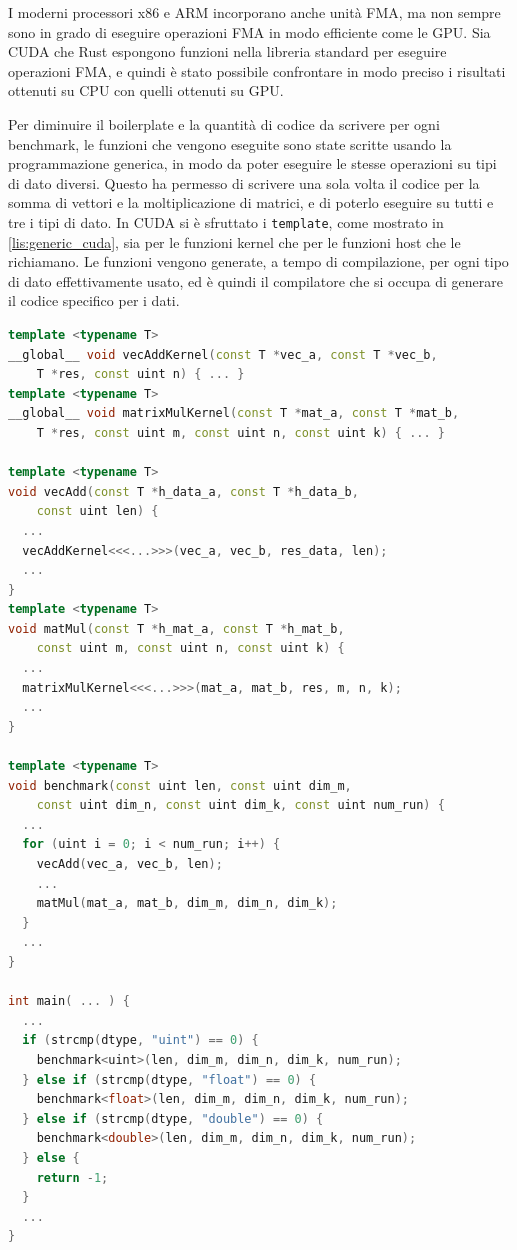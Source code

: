 I moderni processori x86 e ARM incorporano anche unità FMA, ma non sempre sono in grado di eseguire operazioni FMA in modo efficiente come le GPU. Sia CUDA che Rust espongono funzioni nella libreria standard per eseguire operazioni FMA, e quindi è stato possibile confrontare in modo preciso i risultati ottenuti su CPU con quelli ottenuti su GPU.


Per diminuire il boilerplate e la quantità di codice da scrivere per ogni benchmark, le funzioni che vengono eseguite sono state scritte usando la programmazione generica, in modo da poter eseguire le stesse operazioni su tipi di dato diversi. Questo ha permesso di scrivere una sola volta il codice per la somma di vettori e la moltiplicazione di matrici, e di poterlo eseguire su tutti e tre i tipi di dato. In CUDA si è sfruttato i \verb|template|, come mostrato in \ref{lis:generic_cuda}, sia per le funzioni kernel che per le funzioni host che le richiamano. Le funzioni vengono generate, a tempo di compilazione, per ogni tipo di dato effettivamente usato, ed è quindi il compilatore che si occupa di generare il codice specifico per i dati. 

\vspace{5mm}
\begin{lstlisting}[language=C++, caption=Programmazione generica in CUDA, label=lis:generic_cuda]
template <typename T>
__global__ void vecAddKernel(const T *vec_a, const T *vec_b, 
    T *res, const uint n) { ... }
template <typename T>
__global__ void matrixMulKernel(const T *mat_a, const T *mat_b, 
    T *res, const uint m, const uint n, const uint k) { ... }

template <typename T>
void vecAdd(const T *h_data_a, const T *h_data_b, 
    const uint len) { 
  ...
  vecAddKernel<<<...>>>(vec_a, vec_b, res_data, len);
  ...
}
template <typename T>
void matMul(const T *h_mat_a, const T *h_mat_b, 
    const uint m, const uint n, const uint k) { 
  ... 
  matrixMulKernel<<<...>>>(mat_a, mat_b, res, m, n, k);
  ...
}

template <typename T>
void benchmark(const uint len, const uint dim_m, 
    const uint dim_n, const uint dim_k, const uint num_run) {
  ...
  for (uint i = 0; i < num_run; i++) {
    vecAdd(vec_a, vec_b, len);
    ...
    matMul(mat_a, mat_b, dim_m, dim_n, dim_k);
  }
  ...
}

int main( ... ) {
  ...
  if (strcmp(dtype, "uint") == 0) {
    benchmark<uint>(len, dim_m, dim_n, dim_k, num_run);
  } else if (strcmp(dtype, "float") == 0) {
    benchmark<float>(len, dim_m, dim_n, dim_k, num_run);
  } else if (strcmp(dtype, "double") == 0) {
    benchmark<double>(len, dim_m, dim_n, dim_k, num_run);
  } else {
    return -1;
  }
  ...
}
\end{lstlisting}
\vspace{5mm}

